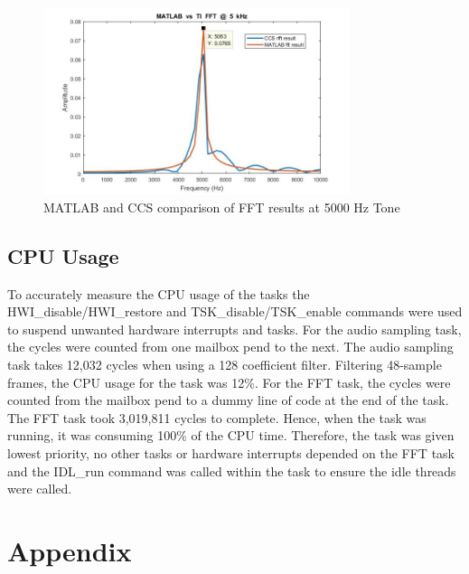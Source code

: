 \documentclass[11pt,pdftex,portrait,letterpaper]{article}
\begin{document}
\begin{figure}[h]
\centering
\includegraphics[width=0.8\textwidth]{./5kCompare}
\caption{MATLAB and CCS comparison of FFT results at 5000 Hz Tone}
\label{f:fig4}
\end{figure}

\subsection{CPU Usage}
To accurately measure the CPU usage of the tasks the HWI\_disable/HWI\_restore and TSK\_disable/TSK\_enable commands were used to suspend unwanted hardware interrupts and tasks. For the audio sampling task, the cycles were counted from one mailbox pend to the next. The audio sampling task takes 12,032 cycles when using a 128 coefficient filter. Filtering 48-sample frames, the CPU usage for the task was 12\%. For the FFT task, the cycles were counted from the mailbox pend to a dummy line of code at the end of the task. The FFT task took 3,019,811 cycles to complete. Hence, when the task was running, it was consuming 100\% of the CPU time. Therefore, the task was given lowest priority, no other tasks or hardware interrupts depended on the FFT task and the IDL\_run command was called within the task to ensure the idle threads were called.

\pagebreak

\section{Appendix}
\end{document}
